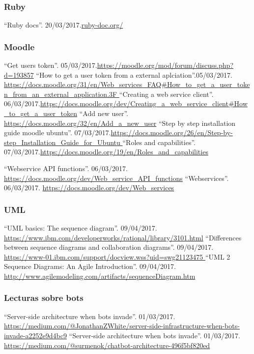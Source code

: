 \documentclass[a4paper,11pt]{book}
\begin{document}

\begin{thebibliography}{99}

\subsubsection*{Ruby}
 ``Ruby docs''. 20/03/2017.\url{ruby-doc.org/}
\subsubsection*{Moodle}

 ``Get users token''. 05/03/2017.\url{https://moodle.org/mod/forum/discuss.php?d=193857}
 ``How to get a user token from a external aplciation''.05/03/2017. \url{https://docs.moodle.org/31/en/Web_services_FAQ#How_to_get_a_user_token_from_an_external_application.3F
}
 ``Creating a web service client''. 06/03/2017.\url{https://docs.moodle.org/dev/Creating_a_web_service_client#How_to_get_a_user_token}
 ``Add new user''. \url{https://docs.moodle.org/32/en/Add_a_new_user}
 ``Step by step installation guide moodle ubuntu''. 07/03/2017.\url{https://docs.moodle.org/26/en/Step-by-step_Installation_Guide_for_Ubuntu
}
 ``Roles and capabilities''. 07/03/2017.\url{https://docs.moodle.org/19/en/Roles_and_capabilities}

 ``Webservice API functions''. 06/03/2017. \url{https://docs.moodle.org/dev/Web_service_API_functions}
 ``Webservices''. 06/03/2017. \url{https://docs.moodle.org/dev/Web_services}

\subsubsection*{UML}
 ``UML basics: The sequence diagram''. 09/04/2017. \url{https://www.ibm.com/developerworks/rational/library/3101.html}
 ``Differences between sequence diagrams and collaboration diagrams''. 09/04/2017. \url{https://www-01.ibm.com/support/docview.wss?uid=swg21123475
}
 ``UML 2 Sequence Diagrams: An Agile Introduction''. 09/04/2017. \url{http://www.agilemodeling.com/artifacts/sequenceDiagram.htm
}
\subsubsection*{Lecturas sobre bots}
 ``Server-side architecture when bots invade''. 01/03/2017. \url{https://medium.com/@JonathanZWhite/server-side-infrastructure-when-bots-invade-a2252e9d4bc9}
 ``Server-side architecture when bots invade''. 01/03/2017. \url{https://medium.com/@surmenok/chatbot-architecture-496f5bf820ed
}



\end{thebibliography}
\end{document}
